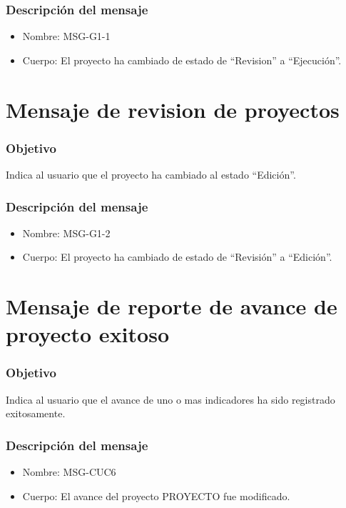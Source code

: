\subsubsection{Descripción del mensaje}
\begin{itemize}
\item Nombre: MSG-G1-1
\item Cuerpo: El proyecto ha cambiado de estado de ``Revision'' a ``Ejecución''.
\end{itemize}

\section{Mensaje de revision de proyectos} \label{MSGg12}

\subsubsection{Objetivo}
Indica al usuario que el proyecto ha cambiado al estado ``Edición''.

\subsubsection{Descripción del mensaje}
\begin{itemize}
\item Nombre: MSG-G1-2
\item Cuerpo: El proyecto ha cambiado de estado de ``Revisión'' a ``Edición''.
\end{itemize}





\section{Mensaje de reporte de avance de proyecto exitoso} \label{MSG_CUC6}

\subsubsection{Objetivo}
Indica al usuario que el avance de uno o mas indicadores ha sido registrado exitosamente.

\subsubsection{Descripción del mensaje}
\begin{itemize}
\item Nombre: MSG-CUC6
\item Cuerpo: El avance del proyecto PROYECTO fue modificado. 
\end{itemize}


